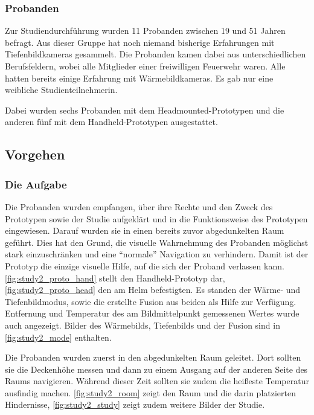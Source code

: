 \subsubsection{Probanden}
Zur Studiendurchführung wurden 11 Probanden zwischen 19 und 51 Jahren befragt.
Aus dieser Gruppe hat noch niemand bisherige Erfahrungen mit Tiefenbildkameras gesammelt.
Die Probanden kamen dabei aus unterschiedlichen Berufsfeldern, wobei alle Mitglieder einer freiwilligen Feuerwehr waren.
Alle hatten bereits einige Erfahrung mit Wärmebildkameras.
Es gab nur eine weibliche Studienteilnehmerin.

Dabei wurden sechs Probanden mit dem Headmounted-Prototypen und die anderen fünf mit dem Handheld-Prototypen ausgestattet.

\subsection{Vorgehen}

\subsubsection{Die Aufgabe}
Die Probanden wurden empfangen, über ihre Rechte und den Zweck des Prototypen sowie der Studie aufgeklärt und in die Funktionsweise des Prototypen eingewiesen.
Darauf wurden sie in einen bereits zuvor abgedunkelten Raum geführt.
Dies hat den Grund, die visuelle Wahrnehmung des Probanden möglichst stark einzuschränken und eine \enquote{normale} Navigation zu verhindern.
Damit ist der Prototyp die einzige visuelle Hilfe, auf die sich der Proband verlassen kann.
\cref{fig:study2_proto_hand} stellt den Handheld-Prototyp dar, \cref{fig:study2_proto_head} den am Helm befestigten.
Es standen der Wärme- und Tiefenbildmodus, sowie die erstellte Fusion aus beiden als Hilfe zur Verfügung.
Entfernung und Temperatur des am Bildmittelpunkt gemessenen Wertes wurde auch angezeigt.
Bilder des Wärmebilds, Tiefenbilds und der Fusion sind in \cref{fig:study2_mode} enthalten.

Die Probanden wurden zuerst in den abgedunkelten Raum geleitet.
Dort sollten sie die Deckenhöhe messen und dann zu einem Ausgang auf der anderen Seite des Raums navigieren.
Während dieser Zeit sollten sie zudem die heißeste Temperatur ausfindig machen.
\cref{fig:study2_room} zeigt den Raum und die darin platzierten Hindernisse, \cref{fig:study2_study} zeigt zudem weitere Bilder der Studie.

